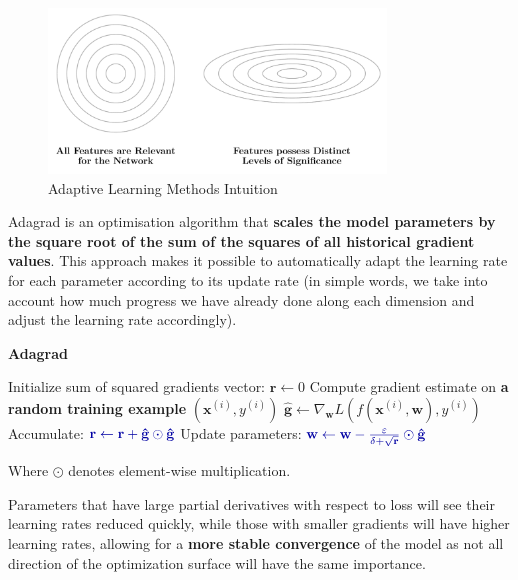 \begin{figure}[htbp]
\centering
\includegraphics[width=0.8\textwidth]{tikz/chapter3 - Features Importance.pdf}
\caption{Adaptive Learning Methods Intuition}
\end{figure}

Adagrad is an optimisation algorithm that \textbf{scales the model parameters by the square root of the sum of the squares of all historical gradient values}. This approach makes it possible to automatically adapt the learning rate for each parameter according to its update rate (in simple words, we take into account how much progress we have already done along each dimension and adjust the learning rate accordingly). 
\begin{algorithm}
\renewcommand\thealgorithm{}
\caption{\textbf{\textcolor{mygreen}{Adagrad}}}
\begin{algorithmic}[1]
\STATE Initialize sum of squared gradients vector: $\mathbf{r} \leftarrow 0$
\STATE Compute gradient estimate on \textbf{\textcolor{myred}{a random training example}} $(\mathbf{x}^{(i)}, y^{(i)})$
\STATE $\mathbf{\hat{g}} \leftarrow \nabla_{\mathbf{w}} L(f(\mathbf{x}^{(i)},\mathbf{w}), y^{(i)})$
\STATE Accumulate:
$\textcolor{mybluee}{\mathbf{r} \leftarrow \mathbf{r} + \mathbf{\hat{g}} \odot \mathbf{\hat{g}}}$
\STATE Update parameters:
$\textcolor{mybluee}{\mathbf{w} \leftarrow \mathbf{w} - \frac{\varepsilon}{\delta + \sqrt{\mathbf{r}}} \odot \mathbf{\hat{g}}}$ 
\ENDWHILE
\end{algorithmic}
\end{algorithm}

Where $\odot$ denotes element-wise multiplication.

Parameters that have large partial derivatives with respect to loss will see their learning rates reduced quickly, while those with smaller gradients will have higher learning rates, allowing for a \textbf{more stable convergence} of the model as not all direction of the optimization surface will have the same importance. 

